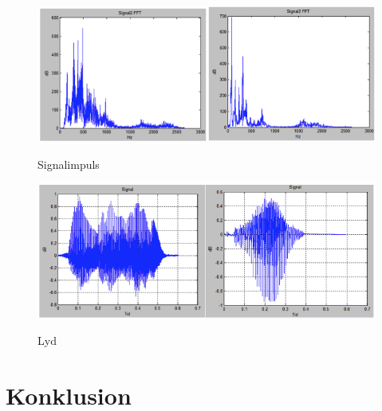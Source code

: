 \begin{figure}[H]
	\centering
	\includegraphics[width=1\textwidth]{Figurer/8}
	\label{Singalimpuls}
	\caption{Signalimpuls}
\end{figure}

\begin{figure}[H]
	\centering
	\includegraphics[width=1\textwidth]{Figurer/10}
	\label{Lyd}
	\caption{Lyd}
\end{figure}

\section{Konklusion}